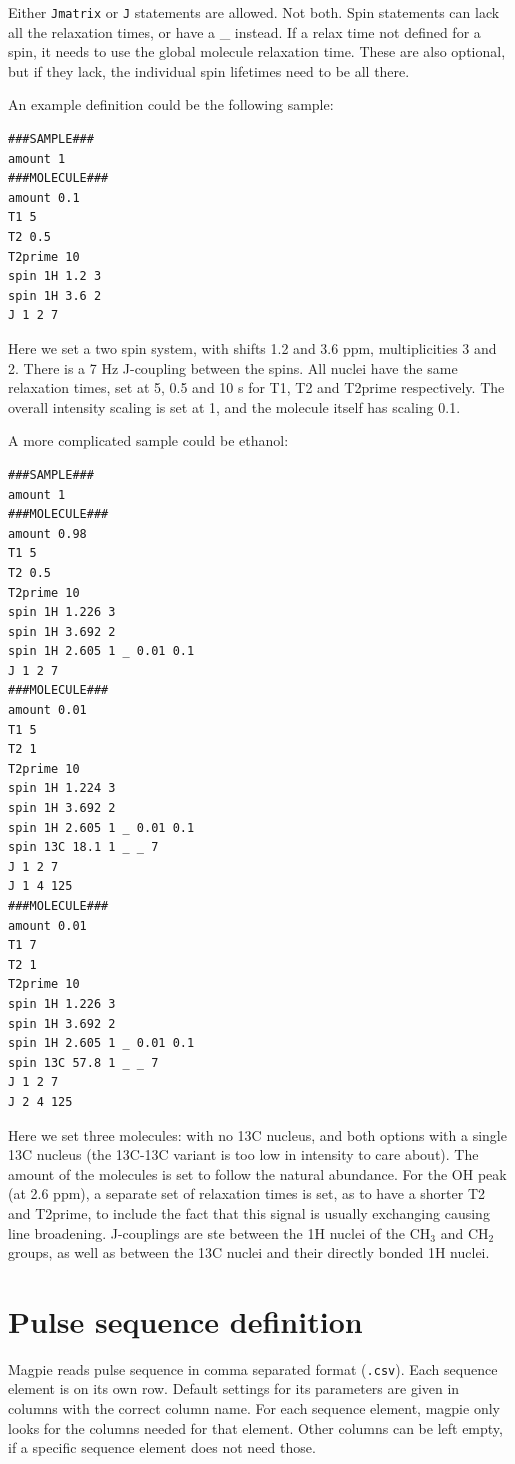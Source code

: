\documentclass[11pt,a4paper]{article}
\begin{document}
Either \texttt{Jmatrix} or \texttt{J} statements are allowed. Not both.
Spin statements can lack all the relaxation times, or have a \_ instead.
If a relax time not defined for a spin, it needs to use the global molecule relaxation time.
These are also optional, but if they lack, the individual spin lifetimes need to be all there.

An example definition could be the following sample:
\begin{verbatim}
###SAMPLE###
amount 1
###MOLECULE###
amount 0.1
T1 5
T2 0.5
T2prime 10
spin 1H 1.2 3
spin 1H 3.6 2
J 1 2 7
\end{verbatim}
Here we set a two spin system, with shifts 1.2 and 3.6 ppm, multiplicities 3 and 2. There is a 7 Hz J-coupling between the spins. All nuclei have the same relaxation times, set at 5, 0.5 and 10 s for T1, T2 and T2prime respectively. The overall intensity scaling is set at 1, and the molecule itself has scaling 0.1.

A more complicated sample could be ethanol:
\begin{verbatim}
###SAMPLE###
amount 1
###MOLECULE###
amount 0.98 
T1 5
T2 0.5
T2prime 10
spin 1H 1.226 3
spin 1H 3.692 2
spin 1H 2.605 1 _ 0.01 0.1
J 1 2 7
###MOLECULE###
amount 0.01 
T1 5
T2 1
T2prime 10
spin 1H 1.224 3
spin 1H 3.692 2
spin 1H 2.605 1 _ 0.01 0.1
spin 13C 18.1 1 _ _ 7
J 1 2 7
J 1 4 125
###MOLECULE###
amount 0.01 
T1 7
T2 1
T2prime 10
spin 1H 1.226 3
spin 1H 3.692 2
spin 1H 2.605 1 _ 0.01 0.1
spin 13C 57.8 1 _ _ 7
J 1 2 7
J 2 4 125
\end{verbatim}
Here we set three molecules: with no 13C nucleus, and both options with a single 13C nucleus (the 13C-13C variant is too low in intensity to care about). The amount of the molecules is set to follow the natural abundance. For the OH peak (at 2.6 ppm), a separate set of relaxation times is set, as to have a shorter T2 and T2prime, to include the fact that this signal is usually exchanging causing line broadening. J-couplings are ste between the 1H nuclei of the CH$_3$ and CH$_2$ groups, as well as between the 13C nuclei and their directly bonded 1H nuclei. 

\section{Pulse sequence definition}\label{sec:pulseseq}
Magpie reads pulse sequence in comma separated format (\texttt{.csv}). Each sequence element is on its own row. Default settings for its parameters are given in columns with the correct column name. For each sequence element, magpie only looks for the columns needed for that element. Other columns can be left empty, if a specific sequence element does not need those.
\end{document}
